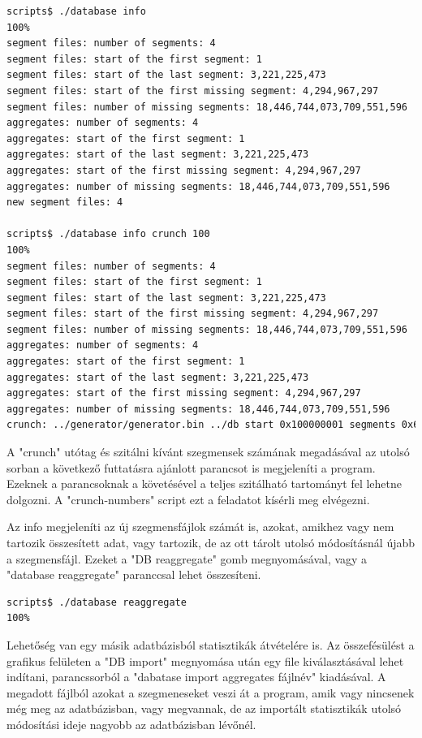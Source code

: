 \documentclass[12pt]{report}
\begin{document}
\tiny
\begin{lstlisting}[language=bash]
scripts$ ./database info
100%
segment files: number of segments: 4
segment files: start of the first segment: 1
segment files: start of the last segment: 3,221,225,473
segment files: start of the first missing segment: 4,294,967,297
segment files: number of missing segments: 18,446,744,073,709,551,596
aggregates: number of segments: 4
aggregates: start of the first segment: 1
aggregates: start of the last segment: 3,221,225,473
aggregates: start of the first missing segment: 4,294,967,297
aggregates: number of missing segments: 18,446,744,073,709,551,596
new segment files: 4

scripts$ ./database info crunch 100
100%
segment files: number of segments: 4
segment files: start of the first segment: 1
segment files: start of the last segment: 3,221,225,473
segment files: start of the first missing segment: 4,294,967,297
segment files: number of missing segments: 18,446,744,073,709,551,596
aggregates: number of segments: 4
aggregates: start of the first segment: 1
aggregates: start of the last segment: 3,221,225,473
aggregates: start of the first missing segment: 4,294,967,297
aggregates: number of missing segments: 18,446,744,073,709,551,596
crunch: ../generator/generator.bin ../db start 0x100000001 segments 0x64
\end{lstlisting}
\small

A "crunch" utótag és szitálni kívánt szegmensek számának megadásával az utolsó sorban
a következő futtatásra ajánlott parancsot is megjeleníti a program.
Ezeknek a parancsoknak a követésével a teljes szitálható tartományt fel lehetne dolgozni.
A "crunch-numbers" script ezt a feladatot kísérli meg elvégezni.

Az info megjeleníti az új szegmensfájlok számát is, azokat,
amikhez vagy nem tartozik összesített adat, vagy tartozik,
de az ott tárolt utolsó módosításnál újabb a szegmensfájl.
Ezeket a "DB reaggregate" gomb megnyomásával,
vagy a "database reaggregate" paranccsal lehet összesíteni.

\tiny
\begin{lstlisting}[language=bash]
scripts$ ./database reaggregate
100%
\end{lstlisting}
\small

Lehetőség van egy másik adatbázisból statisztikák átvételére is.
Az összefésülést a grafikus felületen a "DB import" megnyomása után
egy file kiválasztásával lehet indítani, parancssorból a "dabatase import aggregates fájlnév"
kiadásával. A megadott fájlból azokat a szegmeneseket veszi át a program,
amik vagy nincsenek még meg az adatbázisban, vagy megvannak, de az importált
statisztikák utolsó módosítási ideje nagyobb az adatbázisban lévőnél.
\end{document}
